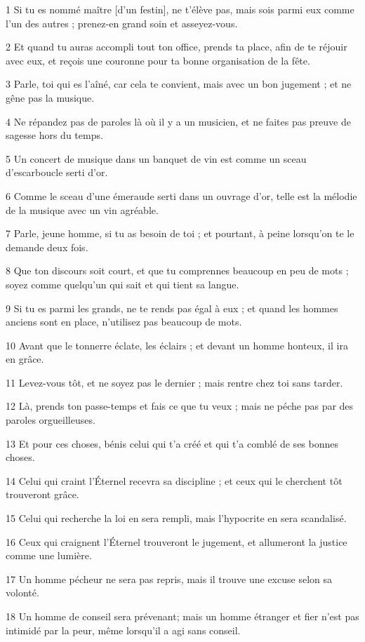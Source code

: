 \par 1 Si tu es nommé maître [d'un festin], ne t'élève pas, mais sois parmi eux comme l'un des autres ; prenez-en grand soin et asseyez-vous.
\par 2 Et quand tu auras accompli tout ton office, prends ta place, afin de te réjouir avec eux, et reçois une couronne pour ta bonne organisation de la fête.
\par 3 Parle, toi qui es l'aîné, car cela te convient, mais avec un bon jugement ; et ne gêne pas la musique.
\par 4 Ne répandez pas de paroles là où il y a un musicien, et ne faites pas preuve de sagesse hors du temps.
\par 5 Un concert de musique dans un banquet de vin est comme un sceau d'escarboucle serti d'or.
\par 6 Comme le sceau d'une émeraude serti dans un ouvrage d'or, telle est la mélodie de la musique avec un vin agréable.
\par 7 Parle, jeune homme, si tu as besoin de toi ; et pourtant, à peine lorsqu'on te le demande deux fois.
\par 8 Que ton discours soit court, et que tu comprennes beaucoup en peu de mots ; soyez comme quelqu'un qui sait et qui tient sa langue.
\par 9 Si tu es parmi les grands, ne te rends pas égal à eux ; et quand les hommes anciens sont en place, n'utilisez pas beaucoup de mots.
\par 10 Avant que le tonnerre éclate, les éclairs ; et devant un homme honteux, il ira en grâce.
\par 11 Levez-vous tôt, et ne soyez pas le dernier ; mais rentre chez toi sans tarder.
\par 12 Là, prends ton passe-temps et fais ce que tu veux ; mais ne péche pas par des paroles orgueilleuses.
\par 13 Et pour ces choses, bénis celui qui t'a créé et qui t'a comblé de ses bonnes choses.
\par 14 Celui qui craint l'Éternel recevra sa discipline ; et ceux qui le cherchent tôt trouveront grâce.
\par 15 Celui qui recherche la loi en sera rempli, mais l'hypocrite en sera scandalisé.
\par 16 Ceux qui craignent l'Éternel trouveront le jugement, et allumeront la justice comme une lumière.
\par 17 Un homme pécheur ne sera pas repris, mais il trouve une excuse selon sa volonté.
\par 18 Un homme de conseil sera prévenant; mais un homme étranger et fier n'est pas intimidé par la peur, même lorsqu'il a agi sans conseil.
